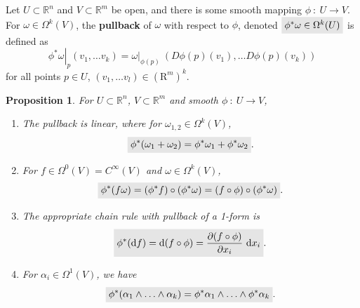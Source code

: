 \documentclass[letter-paper]{tufte-book}
\newtheorem{proposition}[theorem]{\color{pastel-blue}Proposition}
\newcommand{\highlight}[1]{\mathchoice%
  {\colorbox{black!10}{$\displaystyle#1$}}%
  {\colorbox{black!10}{$\textstyle#1$}}%
  {\colorbox{black!10}{$\scriptstyle#1$}}%
  {\colorbox{black!10}{$\scriptscriptstyle#1$}}}%
\begin{document}
Let $U \subset \mathbb{R}^n$ and $V \subset \mathbb{R}^m$ be open, and there is some smooth mapping $\phi\ :\ U \to V$. For $\omega \in \Omega^k(V)$, the \textbf{pullback} of $\omega$ with respect to $\phi$, denoted $\highlight{\phi^* \omega \in \Omega^k(U)}$ is defined as
\begin{equation}
  \left.\phi^* \omega \right|_p (v_1, \ldots v_k) = \left.\omega\right|_{\phi(p)}\ (D\phi(p)(v_1), \ldots D\phi(p)(v_k))
\end{equation}
for all points $p\in U$, $(v_1, \ldots v_l) \in (\mathrm{R}^m)^k$.

\begin{proposition}
  For $U \subset \mathbb{R}^n$, $V \subset \mathbb{R}^m$ and smooth $\phi\ :\ U \to V$,
  \begin{enumerate}
    \item The pullback is linear, where for $\omega_{1,2} \in \Omega^k(V)$,
    \begin{equation}
      \highlight{\phi^* (\omega_1 + \omega_2) = \phi^* \omega_1 + \phi^* \omega_2}.
    \end{equation}
    
    \item For $f\in \Omega^0(V) = C^\infty(V)$ and $\omega \in \Omega^k(V)$,
    \begin{equation}
      \highlight{\phi^* (f\omega) = (\phi^* f) \circ (\phi^* \omega) = (f \circ \phi) \circ (\phi^* \omega)}.
    \end{equation}
    
    \item The appropriate chain rule with pullback of a 1-form is
    \begin{equation}
      \highlight{\phi^* (\mathrm{d}f) = \mathrm{d}(f \circ \phi) = \frac{\partial (f\circ\phi)}{\partial x_i}\ \mathrm{d}x_i}.
    \end{equation}
    
    \item For $\alpha_i \in \Omega^1(V)$, we have
    \begin{equation}
      \highlight{\phi^*(\alpha_1 \wedge \ldots \wedge \alpha_k) = \phi^* \alpha_1 \wedge \ldots \wedge \phi^* \alpha_k}.
    \end{equation}
  \end{enumerate}
\end{proposition}
\end{document}
